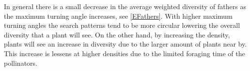 In general there is a small decrease in the average weighted diversity of fathers as the maximum
turning angle increases, see \autoref{EFathers}. With higher maximum turning angles the search
patterns tend to be more circular lowering the overall diversity that a plant will see.  On the
other hand, by increasing the density, plants will see an increase in diversity due to the larger
amount of plants near by.  This increase is lessens at higher densities due to the limited foraging
time of the pollinators.
